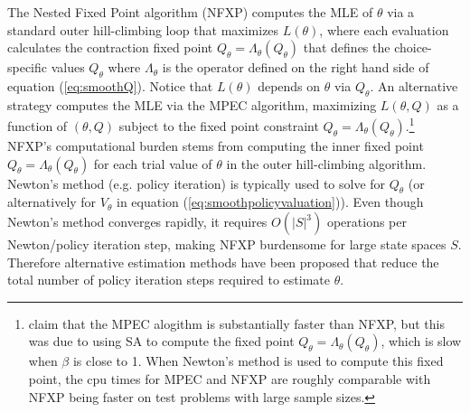 The Nested Fixed Point algorithm (NFXP) \citep{rust:1988} computes the MLE of $\theta$ via a standard outer hill-climbing loop that maximizes $L(\theta)$, where each evaluation calculates
the contraction fixed point $Q_\theta=\Lambda_\theta(Q_\theta)$ that defines the choice-specific values $Q_\theta$ where $\Lambda_\theta$
is the operator defined on the right hand side of equation (\ref{eq:smoothQ}).
Notice that $L(\theta)$ depends on $\theta$ via $Q_\theta$. An alternative strategy \citep{sujudd:2012}
computes the MLE via the MPEC algorithm, maximizing $L(\theta,Q)$ as a function of $(\theta,Q)$
subject to the fixed point constraint $Q_\theta=\Lambda_\theta(Q_\theta)$.\footnote{\footnotesize \citet{sujudd:2012} claim that the
MPEC alogithm is substantially faster than NFXP, but this was due to using SA \citep{sujuddcomment:2016}
to compute the fixed point $Q_\theta=\Lambda_\theta(Q_\theta)$, which is slow when $\beta$ is close to 1. When Newton's method is used
to compute this fixed point, the cpu times for MPEC and NFXP are roughly comparable with NFXP being faster on test problems with
large sample sizes.}
NFXP's computational burden stems from computing the inner fixed point $Q_\theta=\Lambda_\theta(Q_\theta)$
for each trial value of $\theta$ in the outer hill-climbing algorithm. 
Newton's method (e.g. policy iteration) is typically used to solve for $Q_\theta$ (or alternatively for $V_\theta$ in equation
(\ref{eq:smoothpolicyvaluation})). Even though  Newton's method converges rapidly, it requires $O(|S|^3)$ operations per Newton/policy
iteration step, making NFXP burdensome for large state spaces $S$. Therefore alternative estimation methods have been proposed that 
reduce the total number of policy iteration steps required to estimate $\theta$.


